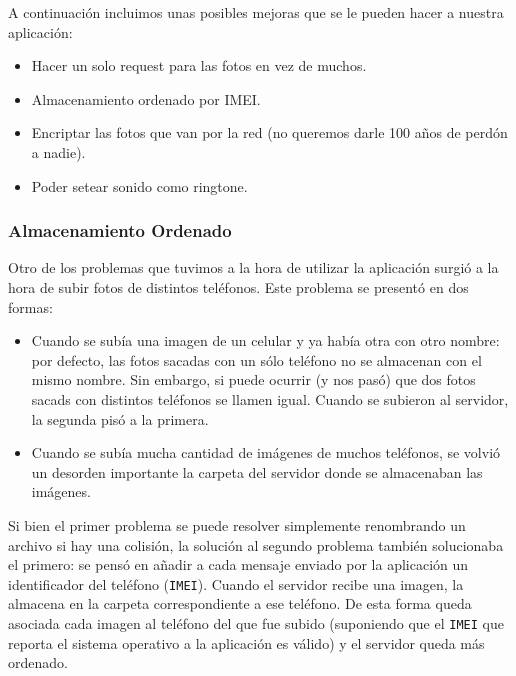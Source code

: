 A continuación incluimos unas posibles mejoras que se le pueden hacer a nuestra aplicación:

\label{ssub:Mejoras}
\begin{itemize}
	\item Hacer un solo request para las fotos en vez de muchos.
	\item Almacenamiento ordenado por IMEI.
	\item Encriptar las fotos que van por la red (no queremos darle 100 años de perdón a nadie).
	\item Poder setear sonido como ringtone.
\end{itemize}

\subsubsection{Almacenamiento Ordenado} %
\label{ssub:almacenamiento_ordenado}

Otro de los problemas que tuvimos a la hora de utilizar la aplicación surgió a la hora de subir fotos de distintos teléfonos. Este problema se presentó en dos formas:
\begin{itemize}
	\item Cuando se subía una imagen de un celular y ya había otra con otro nombre: por defecto, las fotos sacadas con un sólo teléfono no se almacenan con el mismo nombre. Sin embargo, si puede ocurrir (y nos pasó) que dos fotos sacads con distintos teléfonos se llamen igual. Cuando se subieron al servidor, la segunda pisó a la primera.
	\item Cuando se subía mucha cantidad de imágenes de muchos teléfonos, se volvió un desorden importante la carpeta del servidor donde se almacenaban las imágenes.
\end{itemize}


Si bien el primer problema se puede resolver simplemente renombrando un archivo si hay una colisión, la solución al segundo problema también solucionaba el primero: se pensó en añadir a cada mensaje enviado por la aplicación un identificador del teléfono (\texttt{IMEI}). Cuando el servidor recibe una imagen, la almacena en la carpeta correspondiente a ese teléfono. De esta forma queda asociada cada imagen al teléfono del que fue subido (suponiendo que el \texttt{IMEI} que reporta el sistema operativo a la aplicación es válido) y el servidor queda más ordenado.
